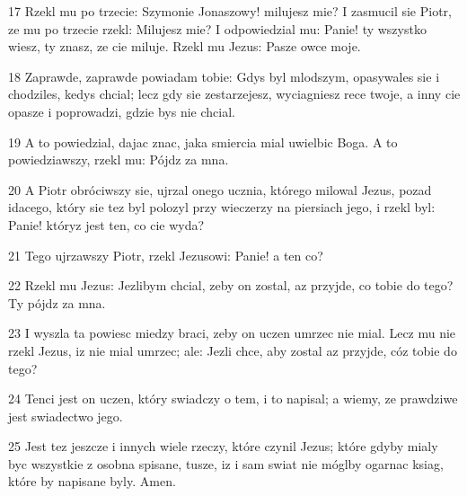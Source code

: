 \par 17 Rzekl mu po trzecie: Szymonie Jonaszowy! milujesz mie? I zasmucil sie Piotr, ze mu po trzecie rzekl: Milujesz mie? I odpowiedzial mu: Panie! ty wszystko wiesz, ty znasz, ze cie miluje. Rzekl mu Jezus: Pasze owce moje.
\par 18 Zaprawde, zaprawde powiadam tobie: Gdys byl mlodszym, opasywales sie i chodziles, kedys chcial; lecz gdy sie zestarzejesz, wyciagniesz rece twoje, a inny cie opasze i poprowadzi, gdzie bys nie chcial.
\par 19 A to powiedzial, dajac znac, jaka smiercia mial uwielbic Boga. A to powiedziawszy, rzekl mu: Pójdz za mna.
\par 20 A Piotr obróciwszy sie, ujrzal onego ucznia, którego milowal Jezus, pozad idacego, który sie tez byl polozyl przy wieczerzy na piersiach jego, i rzekl byl: Panie! któryz jest ten, co cie wyda?
\par 21 Tego ujrzawszy Piotr, rzekl Jezusowi: Panie! a ten co?
\par 22 Rzekl mu Jezus: Jezlibym chcial, zeby on zostal, az przyjde, co tobie do tego? Ty pójdz za mna.
\par 23 I wyszla ta powiesc miedzy braci, zeby on uczen umrzec nie mial. Lecz mu nie rzekl Jezus, iz nie mial umrzec; ale: Jezli chce, aby zostal az przyjde, cóz tobie do tego?
\par 24 Tenci jest on uczen, który swiadczy o tem, i to napisal; a wiemy, ze prawdziwe jest swiadectwo jego.
\par 25 Jest tez jeszcze i innych wiele rzeczy, które czynil Jezus; które gdyby mialy byc wszystkie z osobna spisane, tusze, iz i sam swiat nie móglby ogarnac ksiag, które by napisane byly. Amen.


